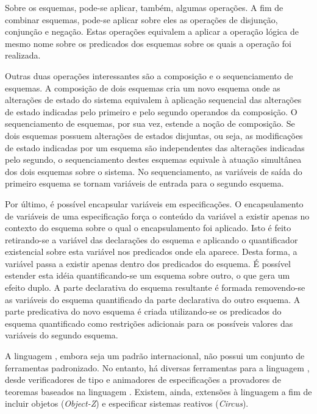 Sobre os esquemas, pode-se aplicar, também, algumas operações.
A fim de combinar esquemas, pode-se aplicar sobre eles as operações de disjunção, conjunção e negação.
Estas operações equivalem a aplicar a operação lógica de mesmo nome sobre os predicados dos esquemas sobre os quais a operação foi realizada.

Outras duas operações interessantes são a composição e o sequenciamento de esquemas.
A composição de dois esquemas cria um novo esquema onde as alterações de estado do sistema equivalem à aplicação sequencial das alterações de estado indicadas pelo primeiro e pelo segundo operandos da composição.
O sequenciamento de esquemas, por sua vez, estende a noção de composição.
Se dois esquemas possuem alterações de estados disjuntas, ou seja, as modificações de estado indicadas por um esquema são independentes das alterações indicadas pelo segundo, o sequenciamento destes esquemas equivale à atuação simultânea dos dois esquemas sobre o sistema.
No sequenciamento, as variáveis de saída do primeiro esquema se tornam variáveis de entrada para o segundo esquema.

Por último, é possível encapsular variáveis em especificações.
O encapsulamento de variáveis de uma especificação força o conteúdo da variável a existir apenas no contexto do esquema sobre o qual o encapsulamento foi aplicado.
Isto é feito retirando-se a variável das declarações do esquema e aplicando o quantificador existencial sobre esta variável nos predicados onde ela aparece.
Desta forma, a variável passa a existir apenas dentro dos predicados do esquema.
É possível estender esta idéia quantificando-se um esquema sobre outro, o que gera um efeito duplo.
A parte declarativa do esquema resultante é formada removendo-se as variáveis do esquema quantificado da parte declarativa do outro esquema.
A parte predicativa do novo esquema é criada utilizando-se os predicados do esquema quantificado como restrições adicionais para os possíveis valores das variáveis do segundo esquema.

A linguagem \Z, embora seja um padrão internacional, não possui um conjunto de ferramentas padronizado.
No entanto, há diversas ferramentas para a linguagem \cite{Malik2005CZT,SpiveyFuzzTypeChecker, SpiveyZWordTools,King1996,ArthanProofPower,Stocks1996,Brucker2003HOLZ2}, desde verificadores de tipo e animadores de especificações a provadores de teoremas baseados na linguagem \HOL.
Existem, ainda, extensões à linguagem a fim de incluir objetos (\textit{Object-Z}\cite{ObjectZ}) e especificar sistemas reativos (\textit{Circus}\cite{Circus}).

